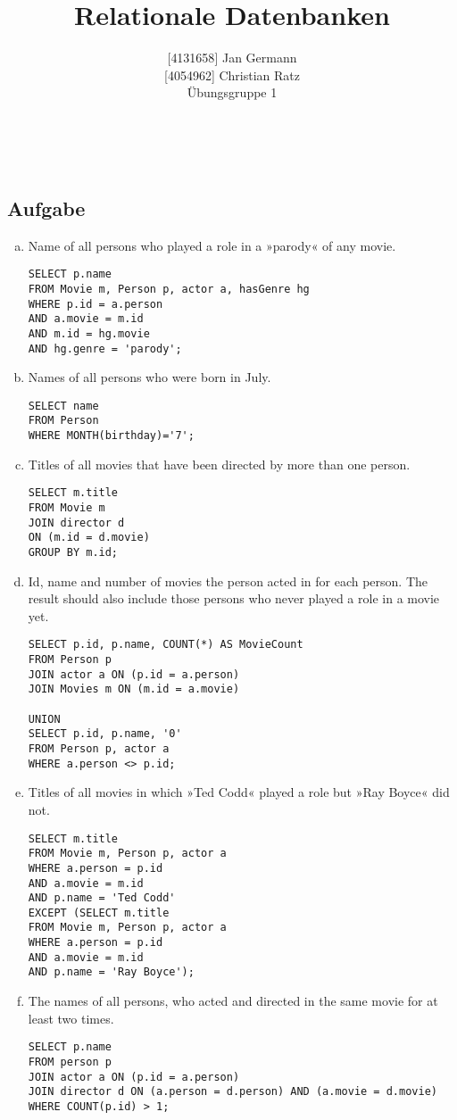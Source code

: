 \documentclass[11pt,a4paper,DIV=9]{scrartcl}
\author{{[}4131658{]} Jan Germann \\{[}4054962{]} Christian Ratz\\Übungsgruppe 1}
\title{Relationale Datenbanken}
\newcounter{temp}
\newcommand{\aufgabe}[1]{
  \setcounter{temp}{\value{subsection}}
  \setcounter{subsection}{#1}
  \addtocounter{subsection}{-1}
  \subsection{Aufgabe}
  \setcounter{subsection}{\value{temp}}
}
\renewcommand{\author}[1]{\renewcommand{\author}{#1}}
\renewcommand{\title}[1]{\renewcommand{\title}{#1}}
\newcommand{\makehomeworktitle}{
  \begin{minipage}[t]{6.5cm}
    \sf{\author}
  \end{minipage}
  \begin{minipage}[t]{6.5cm}
    \begin{flushright}
      \sf{\title\\\today}
    \end{flushright}
  \end{minipage}
  \\[0.2cm]
  \begin{center}
    \sf{
      \color{blue}{
        \LARGE{Aufgabenblatt \blattnr}
      }
    }
  \end{center}
  \vspace{0.1cm}
}
\begin{document}
\makehomeworktitle
\aufgabe{1}
  \begin{enumerate}[a.]
      \item Name of all persons who played a role in a »parody« of any movie.\hfill\\
\begin{lstlisting}
SELECT p.name
FROM Movie m, Person p, actor a, hasGenre hg
WHERE p.id = a.person
AND a.movie = m.id
AND m.id = hg.movie
AND hg.genre = 'parody';
\end{lstlisting}

      \item Names of all persons who were born in July.\hfill\\
\begin{lstlisting}
SELECT name 
FROM Person 
WHERE MONTH(birthday)='7';
\end{lstlisting}

      \item Titles of all movies that have been directed by more than one person.\hfill\\
\begin{lstlisting}
SELECT m.title 
FROM Movie m 
JOIN director d 
ON (m.id = d.movie) 
GROUP BY m.id; 
\end{lstlisting}


      \item Id, name and number of movies the person acted in for each person. The result should also include those persons who never played a role in a movie yet.\hfill\\
\begin{lstlisting}
SELECT p.id, p.name, COUNT(*) AS MovieCount 
FROM Person p 
JOIN actor a ON (p.id = a.person) 
JOIN Movies m ON (m.id = a.movie) 

UNION
SELECT p.id, p.name, '0' 
FROM Person p, actor a 
WHERE a.person <> p.id;
\end{lstlisting}


      \item Titles of all movies in which »Ted Codd« played a role but »Ray Boyce« did not.\hfill\\
\begin{lstlisting}
SELECT m.title 
FROM Movie m, Person p, actor a  
WHERE a.person = p.id 
AND a.movie = m.id 
AND p.name = 'Ted Codd' 
EXCEPT (SELECT m.title 
FROM Movie m, Person p, actor a 
WHERE a.person = p.id 
AND a.movie = m.id 
AND p.name = 'Ray Boyce');
\end{lstlisting}


      \item The names of all persons, who acted and directed in the same movie for at least two times.\hfill\\
\begin{lstlisting}
SELECT p.name 
FROM person p 
JOIN actor a ON (p.id = a.person) 
JOIN director d ON (a.person = d.person) AND (a.movie = d.movie) 
WHERE COUNT(p.id) > 1;
\end{lstlisting}
 


\end{enumerate}
\end{document}
